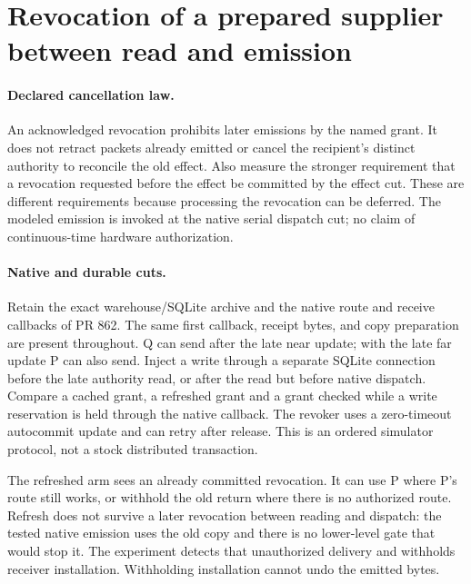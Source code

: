 \documentclass{article}
\begin{document}
\section*{Revocation of a prepared supplier between read and emission}
\paragraph{Declared cancellation law.}
An acknowledged revocation prohibits later emissions by the named
grant. It does not retract packets already emitted or cancel the
recipient's distinct authority to reconcile the old effect. Also
measure the stronger requirement that a revocation requested before
the effect be committed by the effect cut. These are different
requirements because processing the revocation can be deferred.
The modeled emission is invoked at the native serial dispatch cut;
no claim of continuous-time hardware authorization.

\paragraph{Native and durable cuts.}
Retain the exact warehouse/SQLite archive and the native route and
receive callbacks of PR 862. The same first callback, receipt bytes,
and copy preparation are present throughout. Q can send after the
late near update; with the late far update P can also send. Inject
a write through a separate SQLite connection before the late authority
read, or after the read but before native dispatch. Compare a cached
grant, a refreshed grant and a grant checked while a write reservation
is held through the native callback. The revoker uses a zero-timeout
autocommit update and can retry after release. This is an ordered
simulator protocol, not a stock distributed transaction.

The refreshed arm sees an already committed revocation. It can use P
where P's route still works, or withhold the old return where there is
no authorized route. Refresh does not survive a later revocation
between reading and dispatch: the tested native emission uses the old
copy and there is no lower-level gate that would stop it. The
experiment detects that unauthorized delivery and withholds receiver
installation. Withholding installation cannot undo the emitted bytes.
\end{document}
